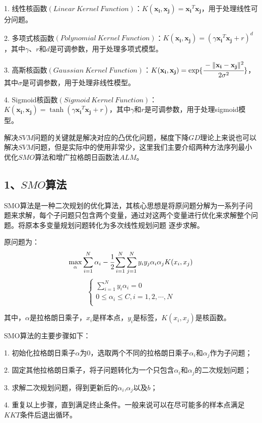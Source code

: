 \documentclass{article}
\begin{document}
1. 线性核函数$(Linear\ Kernel\ Function)$：$K(\mathbf{x_i},\mathbf{x_j})=\mathbf{x_i}^T\mathbf{x_j}$，用于处理线性可分问题。

2. 多项式核函数$(Polynomial\ Kernel\ Function)$：$K(\mathbf{x_i},\mathbf{x_j})=(\gamma\mathbf{x_i}^T\mathbf{x_j}+r)^d$，其中$\gamma$、$r$和$d$是可调参数，用于处理多项式模型。

3. 高斯核函数$(Gaussian\ Kernel\ Function)$：$K(\mathbf{x_i},\mathbf{x_j})=\exp\{\cfrac{-\lVert \mathbf{x_i}- \mathbf{x_j} \rVert^2}{2\sigma^2}\}$，其中$\sigma$是可调参数，用于处理非线性模型。

4. Sigmoid核函数$(Sigmoid\ Kernel\ Function)$：$K(\mathbf{x_i},\mathbf{x_j})=\tanh(\gamma\mathbf{x_i}^T\mathbf{x_j}+r)$，其中$\gamma$和$r$是可调参数，用于处理sigmoid模型。

解决$SVM$问题的关键就是解决对应的凸优化问题，梯度下降$GD$理论上来说也可以解决$SVM$问题，但是实际中的使用非常少，这里我们主要介绍两种方法序列最小优化$SMO$算法和增广拉格朗日函数法$ALM$。

\subsection*{\Large 1、$SMO$算法}
SMO算法是一种二次规划的优化算法，其核心思想是将原问题分解为一系列子问题来求解，每个子问题只包含两个变量，通过对这两个变量进行优化来求解整个问题。将原本多变量规划问题转化为多次线性规划问题
逐步求解。

原问题为：
$$\max\limits_{\alpha}\sum_{i=1}^{N}\alpha_i-\cfrac{1}{2}\sum_{i=1}^{N}\sum_{j=1}^{N}y_iy_j\alpha_i\alpha_jK(x_i,x_j)$$
$$\begin{cases}
\sum\limits_{i=1}^N y_i\alpha_i=0 \\ 
0 \leq \alpha_i \leq C,i=1,2,\cdots,N \\
\end{cases}$$

其中，$\alpha$是拉格朗日乘子，$x_i$是样本点，$y_i$是标签，$K(x_i,x_j)$是核函数。

SMO算法的主要步骤如下：

1. 初始化拉格朗日乘子$\alpha$为0，选取两个不同的拉格朗日乘子$\alpha_i$和$\alpha_j$作为子问题；

2. 固定其他拉格朗日乘子，将子问题转化为一个只包含$\alpha_i$和$\alpha_j$的二次规划问题；

3. 求解二次规划问题，得到更新后的$\alpha_i$,$\alpha_j$以及$b$；

4. 重复以上步骤，直到满足终止条件。一般来说可以在尽可能多的样本点满足$KKT$条件后退出循环。
\end{document}
